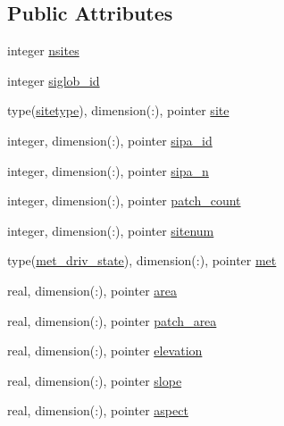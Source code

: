 \subsection*{Public Attributes}
\begin{DoxyCompactItemize}
\item 
integer \hyperlink{structed__state__vars_1_1polygontype_a34ce3617f422a8a41500a0d0c771605d}{nsites}
\item 
integer \hyperlink{structed__state__vars_1_1polygontype_a2637538336203cb4eda18c31331df88d}{siglob\+\_\+id}
\item 
type(\hyperlink{structed__state__vars_1_1sitetype}{sitetype}), dimension(\+:), pointer \hyperlink{structed__state__vars_1_1polygontype_a3e5e61c5a41a88774425d634de9dc1da}{site}
\item 
integer, dimension(\+:), pointer \hyperlink{structed__state__vars_1_1polygontype_a12e4757484e2fb2884b823ce0302bf8f}{sipa\+\_\+id}
\item 
integer, dimension(\+:), pointer \hyperlink{structed__state__vars_1_1polygontype_a88562494a79c8f6621d6fb5f1ff504e8}{sipa\+\_\+n}
\item 
integer, dimension(\+:), pointer \hyperlink{structed__state__vars_1_1polygontype_a2d531d1d96165a81741ec8bdde7958cd}{patch\+\_\+count}
\item 
integer, dimension(\+:), pointer \hyperlink{structed__state__vars_1_1polygontype_aed84d86579d899c0fd8aa3fef1417b57}{sitenum}
\item 
type(\hyperlink{structmet__driver__coms_1_1met__driv__state}{met\+\_\+driv\+\_\+state}), dimension(\+:), pointer \hyperlink{structed__state__vars_1_1polygontype_a4a74c13f53169607f3d92a08b7ea3850}{met}
\item 
real, dimension(\+:), pointer \hyperlink{structed__state__vars_1_1polygontype_a7eff8b746b03a9166df40c20d7983053}{area}
\item 
real, dimension(\+:), pointer \hyperlink{structed__state__vars_1_1polygontype_a44b637d5d9264b49274f851d532feb1d}{patch\+\_\+area}
\item 
real, dimension(\+:), pointer \hyperlink{structed__state__vars_1_1polygontype_a11f4174bb1599e650b8bb22737ab61ca}{elevation}
\item 
real, dimension(\+:), pointer \hyperlink{structed__state__vars_1_1polygontype_aa398d5e277e90f5ef4e553b600047745}{slope}
\item 
real, dimension(\+:), pointer \hyperlink{structed__state__vars_1_1polygontype_ae6537b35e9d4482324fc025f55fac5f3}{aspect}
\item 

\end{DoxyCompactItemize}
